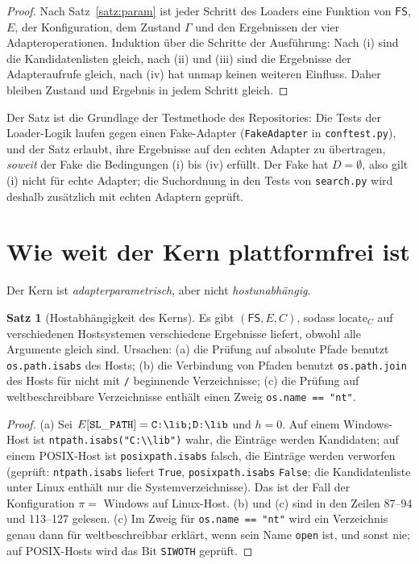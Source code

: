 \documentclass[a4paper,12pt,twoside]{report}
\DeclareRobustCommand{\_}{\ifmmode\mbox{\textunderscore}\else\textunderscore\allowbreak{}\fi}
\theoremstyle{definition}
\newtheorem{satz}{Satz}[chapter]
\newcommand{\FS}{\mathsf{FS}}
\begin{document}
\begin{proof}
	Nach Satz~\ref{satz:param} ist jeder Schritt des Loaders eine Funktion von $\FS$, $E$, der Konfiguration, dem Zustand $\Gamma$ und den Ergebnissen der vier Adapteroperationen. Induktion über die Schritte der Ausführung: Nach (i) sind die Kandidatenlisten gleich, nach (ii) und (iii) sind die Ergebnisse der Adapteraufrufe gleich, nach (iv) hat $\mathrm{unmap}$ keinen weiteren Einfluss. Daher bleiben Zustand und Ergebnis in jedem Schritt gleich.
\end{proof}

Der Satz ist die Grundlage der Testmethode des Repositories: Die Tests der Loader-Logik laufen gegen einen Fake-Adapter (\texttt{FakeAdapter} in \texttt{conftest.py}), und der Satz erlaubt, ihre Ergebnisse auf den echten Adapter zu übertragen, \emph{soweit} der Fake die Bedingungen (i) bis (iv) erfüllt. Der Fake hat $D=\emptyset$, also gilt (i) nicht für echte Adapter; die Suchordnung in den Tests von \texttt{search.py} wird deshalb zusätzlich mit echten Adaptern geprüft.

\section{Wie weit der Kern plattformfrei ist}
\label{sec:plattformfrei}

Der Kern ist \emph{adapterparametrisch}, aber nicht \emph{hostunabhängig}.

\begin{satz}[Hostabhängigkeit des Kerns]
	\label{satz:host}
	Es gibt $(\FS,E,C)$, sodass $\mathrm{locate}_C$ auf verschiedenen Hostsystemen verschiedene Ergebnisse liefert, obwohl alle Argumente gleich sind. Ursachen: (a) die Prüfung auf absolute Pfade benutzt \texttt{os.path.isabs} des Hosts; (b) die Verbindung von Pfaden benutzt \texttt{os.path.join} des Hosts für nicht mit \texttt{/} beginnende Verzeichnisse; (c) die Prüfung auf weltbeschreibbare Verzeichnisse enthält einen Zweig \texttt{os.name == "nt"}.
\end{satz}

\begin{proof}
	(a) Sei $E[\mathtt{SL\_PATH}]=\texttt{C:\textbackslash lib;D:\textbackslash lib}$ und $h=0$. Auf einem Windows-Host ist \texttt{ntpath.isabs("C:\textbackslash\textbackslash lib")} wahr, die Einträge werden Kandidaten; auf einem POSIX-Host ist \texttt{posixpath.isabs} falsch, die Einträge werden verworfen (geprüft: \texttt{ntpath.isabs} liefert \texttt{True}, \texttt{posixpath.isabs} \texttt{False}; die Kandidatenliste unter Linux enthält nur die Systemverzeichnisse). Das ist der Fall der Konfiguration $\pi=$ Windows auf Linux-Host. (b) und (c) sind in den Zeilen 87--94 und 113--127 gelesen. (c) Im Zweig für \texttt{os.name == "nt"} wird ein Verzeichnis genau dann für weltbeschreibbar erklärt, wenn sein Name \texttt{open} ist, und sonst nie; auf POSIX-Hosts wird das Bit \texttt{S\_IWOTH} geprüft.
\end{proof}
\end{document}
